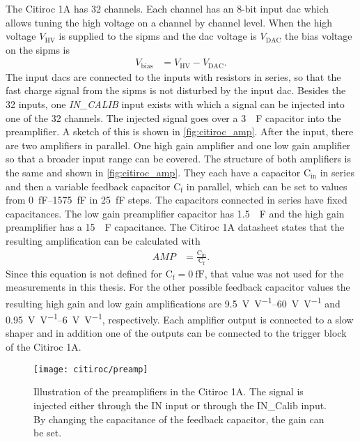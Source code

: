 The Citiroc 1A has 32 channels. 
Each channel has an 8-bit input \ac{dac} which allows tuning the high voltage on a channel by channel level.
When the high voltage $V_\text{HV}$ is supplied to the \ac{sipm}s and the \ac{dac} voltage is $V_\text{DAC}$ the bias voltage on the \ac{sipm}s is
\begin{align}
	V_\text{bias} &= V_\text{HV} - V_\text{DAC}.
\end{align}
The input \ac{dac}s are connected to the inputs with resistors in series, so that the fast charge signal from the \ac{sipm}s is not disturbed by the input \ac{dac}.
Besides the 32 inputs, one \textit{IN\_CALIB} input exists with which a signal can be injected into one of the 32 channels.
The injected signal goes over a \SI{3}{\piko\farad} capacitor into the preamplifier.
A sketch of this is shown in \autoref{fig:citiroc_amp}.
After the input, there are two amplifiers in parallel.
One high gain amplifier and one low gain amplifier so that a broader input range can be covered.
The structure of both amplifiers is the same and shown in \autoref{fig:citiroc_amp}.
They each have a capacitor $\text{C}_\text{in}$ in series and then a variable feedback capacitor $\text{C}_\text{f}$ in parallel, which can be set to values from \SIrange{0}{1575}{\femto\farad} in \SI{25}{\femto\farad} steps.
The capacitors connected in series have fixed capacitances.
The low gain preamplifier capacitor has \SI{1.5}{\piko\farad} and the high gain preamplifier has a \SI{15}{\piko\farad} capacitance.
The Citiroc 1A datasheet states that the resulting amplification can be calculated with
\begin{align}
	AMP &= \frac{\text{C}_\text{in}}{\text{C}_\text{f}}.
\end{align}
Since this equation is not defined for $\text{C}_\text{f}=\SI{0}{\femto\farad}$, that value was not used for the measurements in this thesis.
For the other possible feedback capacitor values the resulting high gain and low gain amplifications are \SIrange[per-mode=symbol]{9.5}{60}{\volt\per\volt} and \SIrange[per-mode=symbol]{0.95}{6}{\volt\per\volt}, respectively. 
Each amplifier output is connected to a slow shaper and in addition one of the outputs can be connected to the trigger block of the Citiroc 1A.

\begin{figure}
	\centering
	\texttt{[image: citiroc/preamp]}
	\caption[Sketch of the Citiroc 1As preamplifiers]{Illustration of the preamplifiers in the Citiroc 1A. The signal is injected either through the IN input or through the IN\_Calib input. By changing the capacitance of the feedback capacitor, the gain can be set. \cite{citiroc}}
	\label{fig:citiroc_amp}
\end{figure}



